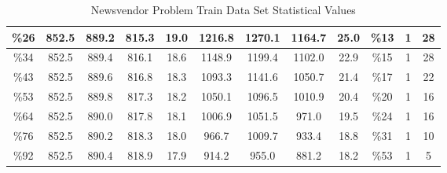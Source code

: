 \documentclass[12pt]{article}
\begin{document}
\begin{table}
{\begin{tabular}{|c|c|c|c|c|c|c|c|c|c|c|c|}
\%26                                                                                               & 852.5         & 889.2        & 815.3        & 19.0            & 1216.8        & 1270.1       & 1164.7       & 25.0            & \%13                                    & 1 & 28                                                                                         \\ \hline
\%34                                                                                               & 852.5         & 889.4        & 816.1        & 18.6            & 1148.9        & 1199.4       & 1102.0       & 22.9            & \%15                                    & 1    & 28                                                                                                 \\ \hline
\%43                                                                                               & 852.5         & 889.6        & 816.8        & 18.3            & 1093.3        & 1141.6       & 1050.7       & 21.4            & \%17                                    & 1    & 22                                                                                                 \\ \hline
\%53                                                                                               & 852.5         & 889.8        & 817.3        & 18.2            & 1050.1        & 1096.5       & 1010.9       & 20.4            & \%20                                    & 1    & 16                                                                                                 \\ \hline
\%64                                                                                               & 852.5         & 890.0        & 817.8        & 18.1            & 1006.9        & 1051.5       & 971.0        & 19.5            & \%24                                    & 1    & 16                                                                                                 \\ \hline
\%76                                                                                               & 852.5         & 890.2        & 818.3        & 18.0            & 966.7         & 1009.7       & 933.4        & 18.8            & \%31                                    & 1       & 10                                                                                              \\ \hline
\%92                                                                                               & 852.5         & 890.4        & 818.9        & 17.9            & 914.2         & 955.0        & 881.2        & 18.2            & \%53                                    & 1      & 5                                                                                               \\ \hline
\end{tabular}}
\caption{Newsvendor Problem Train Data Set Statistical Values} 
\label{tab:table1}
\end{table} 
\end{document}
